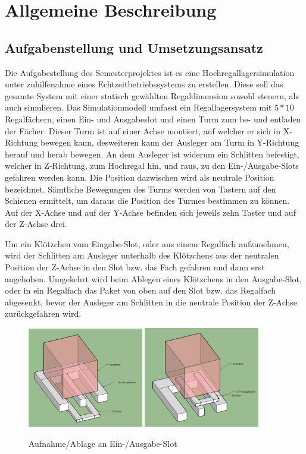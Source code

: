 \section{Allgemeine Beschreibung}
\subsection{Aufgabenstellung und Umsetzungsansatz}
Die Aufgabestellung des Semesterprojektes ist es eine Hochregallagersimulation unter zuhilfenahme eines Echtzeitbetriebssystems zu erstellen. Diese soll das gesamte System mit einer statisch gewählten Regaldimension sowohl steuern, als auch simulieren.
Das Simulationmodell umfasst ein Regallagersystem mit $5*10$ Regalfächern, einen Ein- und Ausgabeslot und einen Turm zum be- und entladen der Fächer. Dieser Turm ist auf einer Achse montiert, auf welcher er sich in X-Richtung bewegen kann, desweiteren kann der Ausleger am Turm in Y-Richtung herauf und herab bewegen. An dem Ausleger ist widerum ein Schlitten befestigt, welcher in Z-Richtung, zum Hochregal hin, und raus, zu den Ein-/Ausgabe-Slots gefahren werden kann. Die Position dazwischen wird als neutrale Position bezeichnet. Sämtliche Bewegungen des Turms werden von Tastern auf den Schienen ermittelt, um daraus die Position des Turmes bestimmen zu können. Auf der X-Achse und auf der Y-Achse befinden sich jeweils zehn Taster und auf der Z-Achse drei.

Um ein Klötzchen vom Eingabe-Slot, oder aus einem Regalfach aufzunehmen, wird der Schlitten am Ausleger unterhalb des Klötzchens aus der neutralen Position der Z-Achse in den Slot bzw. das Fach gefahren und dann erst angehoben. Umgekehrt wird beim Ablegen eines Klötzchens in den Ausgabe-Slot, oder in ein Regalfach das Paket von oben auf den Slot bzw. das Regalfach abgesenkt, bevor der Ausleger am Schlitten  in die neutrale Position der Z-Achse zurückgefahren wird.
\begin{figure}[H]
	\centering
  \includegraphics[width=0.45\textwidth]{diagrams/vonunten.jpg}
  \includegraphics[width=0.45\textwidth]{diagrams/auflegernachoben.jpg}
	\caption{Aufnahme/Ablage an Ein-/Ausgabe-Slot}
	\label{fig2}
\end{figure}

